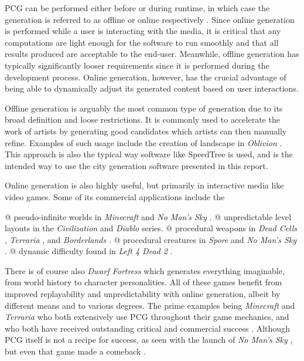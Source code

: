 \newpage
PCG can be performed either before or during runtime, in which case the generation is referred to as offline or online respectively \cite[p. 7-8]{pcg_in_games}.
Since online generation is performed while a user is interacting with the media, it is critical that any computations are light enough for the software to run smoothly and that all results produced are acceptable to the end-user.
Meanwhile, offline generation has typically significantly looser requirements since it is performed during the development process.
Online generation, however, has the crucial advantage of being able to dynamically adjust its generated content based on user interactions.

Offline generation is arguably the most common type of generation due to its broad definition and loose restrictions.
It is commonly used to accelerate the work of artists by generating good candidates which artists can then manually refine. Examples of such usage include the creation of landscape in \textit{Oblivion} \cite{elder_scrolls_iv}.
This approach is also the typical way software like SpeedTree \cite{speedtree} is used, and is the intended way to use the city generation software presented in this report.

Online generation is also highly useful, but primarily in interactive media like video games.
Some of its commercial applications include the
\begin{easylist}
  @ pseudo-infinite worlds in \textit{Minecraft} \cite{minecraft} and \textit{No Man's Sky} \cite{no_man_sky}.
  @ unpredictable level layouts in the \textit{Civilization} \cite{civilization} and \textit{Diablo} \cite{diablo} series.
  @ procedural weapons in \textit{Dead Cells} \cite{dead_cells}, \textit{Terraria} \cite{terraria}, and \textit{Borderlands} \cite{borderlands}.
  @ procedural creatures in \textit{Spore} \cite{spore} \cite{pcg_for_everyone} and \textit{No Man's Sky} \cite{no_man_sky}.
  @ dynamic difficulty found in \textit{Left 4 Dead 2} \cite{left_4_dead_2}.
\end{easylist}
There is of course also \textit{Dwarf Fortress} \cite{dwarf_fortress} which generates everything imaginable, from world history to character personalities.
All of these games benefit from improved replayability and unpredictability with online generation, albeit by different means and to various degrees.
The prime examples being \textit{Minecraft} and \textit{Terraria} who both extensively use PCG throughout their game mechanics, and who both have received outstanding critical and commercial success \cite{minecraft_reviews} \cite{minecraft_commercial} \cite{terraria_reviews} \cite{terraria_commercial}.
Although PCG itself is not a recipe for success, as seen with the launch of \textit{No Man's Sky} \cite{no_man_sky_launch}, but even that game made a comeback \cite{no_man_sky_comeback}.

